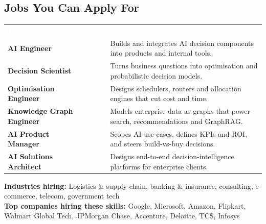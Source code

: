 \documentclass[10pt,a4paper]{article}
\newcommand{\hdr}{\rowcolor{navy}}
\newcommand{\hw}[1]{\textcolor{white}{\bfseries #1}}
\begin{document}
\subsection*{Jobs You Can Apply For}
\par{\small\begin{tabularx}{\linewidth}{@{}>{\raggedright\arraybackslash}p{4.6cm}>{\raggedright\arraybackslash}p{2.5cm}Y@{}}\hdr\hw{Job role}&\hw{Level}&\hw{What the role does}\\
\textbf{AI Engineer} &  & Builds and integrates AI decision components into products and internal tools.\\
\textbf{Decision Scientist} &  & Turns business questions into optimisation and probabilistic decision models.\\
\textbf{Optimisation Engineer} &  & Designs schedulers, routers and allocation engines that cut cost and time.\\
\textbf{Knowledge Graph Engineer} &  & Models enterprise data as graphs that power search, recommendations and GraphRAG.\\
\textbf{AI Product Manager} &  & Scopes AI use-cases, defines KPIs and ROI, and steers build-vs-buy decisions.\\
\textbf{AI Solutions Architect} &  & Designs end-to-end decision-intelligence platforms for enterprise clients.\\
\end{tabularx}}
{\small\textbf{Industries hiring:} Logistics \& supply chain, banking \& insurance, consulting, e-commerce, telecom, government tech\\[2pt]\textbf{Top companies hiring these skills:} Google, Microsoft, Amazon, Flipkart, Walmart Global Tech, JPMorgan Chase, Accenture, Deloitte, TCS, Infosys}
\end{document}

